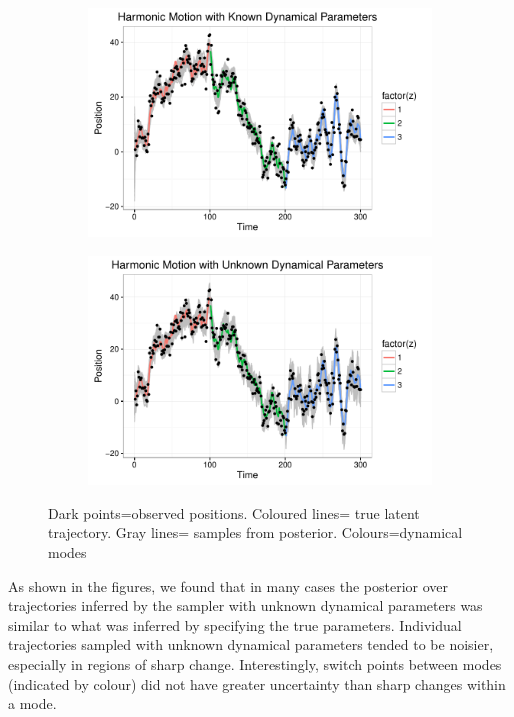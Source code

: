 \documentclass{article} %
\begin{document}
\begin{figure}
\begin{subfigure}[b]{\textwidth}
  \centering
  \includegraphics[width = \linewidth]{"./plot/lds/03_harmonic_known"}
\end{subfigure}

\begin{subfigure}[b]{\textwidth}
  \includegraphics[width = \linewidth]{"./plot/lds/04_harmonic_unknown"}
 \end{subfigure}
   \caption{Dark points=observed positions. Coloured lines= true latent trajectory. Gray lines= samples from posterior. Colours=dynamical modes}
\end{figure}


\clearpage

As shown in the figures, we found that in many cases the posterior over trajectories inferred by the sampler with unknown dynamical parameters was similar to what was inferred by specifying the true parameters. Individual trajectories sampled with unknown dynamical parameters tended to be noisier, especially in regions of sharp change. Interestingly, switch points between modes (indicated by colour) did not have greater uncertainty than sharp changes within a mode.
\end{document}
